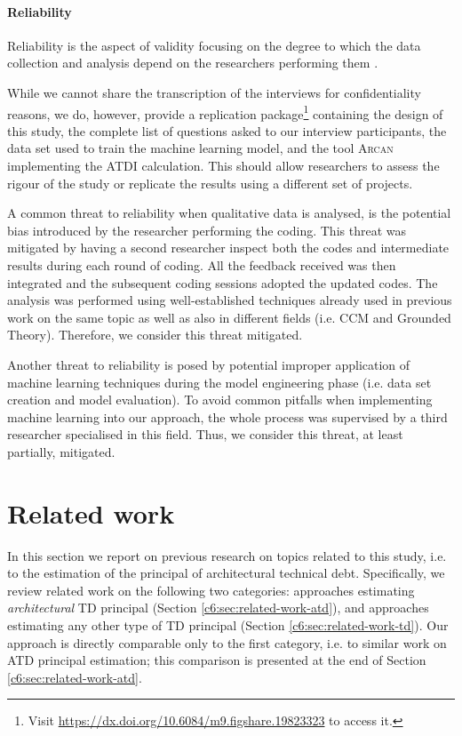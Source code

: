 \paragraph*{Reliability}
Reliability is the aspect of validity focusing on the degree to which the data collection and analysis depend on the researchers performing them \cite{Runeson2012}.

While we cannot share the transcription of the interviews for confidentiality reasons, we do, however, provide a replication package\footnote{Visit \url{https://dx.doi.org/10.6084/m9.figshare.19823323} to access it.} containing the design of this study, the complete list of questions asked to our interview participants, the data set used to train the machine learning model, and the tool \textsc{Arcan} implementing the ATDI calculation.
This should allow researchers to assess the rigour of the study or replicate the results using a different set of projects.

A common threat to reliability when qualitative data is analysed, is the potential bias introduced by the researcher performing the coding.
This threat was mitigated by having a second researcher inspect both the codes and intermediate results during each round of coding. All the feedback received was then integrated and the subsequent coding sessions adopted the updated codes.
The analysis was performed using well-established techniques already used in previous work on the same topic as well as also in different fields (i.e. CCM and Grounded Theory).
Therefore, we consider this threat mitigated.

Another threat to reliability is posed by potential improper application of machine learning techniques during the model engineering phase (i.e. data set creation and model evaluation). 
To avoid common pitfalls when implementing machine learning into our approach, 
the whole process was supervised by a third researcher specialised in this field.
Thus, we consider this threat, at least partially, mitigated.


\section{Related work}\label{c6:sec:related-work}
In this section we report on previous research on topics related to this study, i.e. to the estimation of the principal of architectural technical debt. Specifically, we review related work on the following two categories: approaches estimating \emph{architectural} TD principal (Section \ref{c6:sec:related-work-atd}), and approaches estimating any other type of TD principal (Section \ref{c6:sec:related-work-td}).
Our approach is directly comparable only to the first category, i.e. to similar work on ATD principal estimation; this comparison is presented at the end of Section \ref{c6:sec:related-work-atd}.

